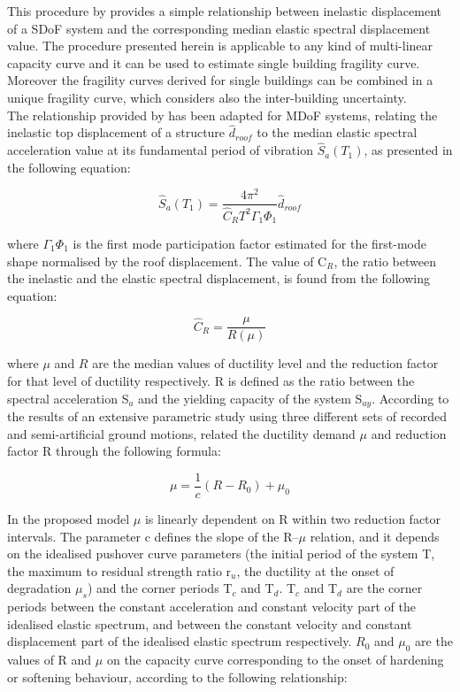 This procedure by \citep{DolsekFajfar2004} provides a simple relationship between inelastic displacement of a SDoF system and the corresponding median elastic spectral displacement value. The procedure presented herein is applicable to any kind of multi-linear capacity curve and it can be used to estimate single building fragility curve. Moreover the fragility curves derived for single buildings can be combined in a unique fragility curve, which considers also the inter-building uncertainty.\\

The relationship provided by \citep{DolsekFajfar2004} has been adapted for MDoF systems, relating the inelastic top displacement of a structure $\hat{d}_{roof}$ to the median elastic spectral acceleration value at its fundamental period of vibration $\hat{S}_{a}(T_1)$, as presented in the following equation:
 
\begin{equation}
\hat{S}_a(T_1) = \frac{4 \pi^2}{\hat{C}_R T^2 \Gamma_1 \Phi_1} \hat{d}_{roof}
\label{eq:basic_DF}
\end{equation}

where $\Gamma_1 \Phi_1$ is the first mode participation factor estimated for the first-mode shape normalised by the roof displacement. The value of C$_R$, the ratio between the inelastic and the elastic spectral displacement, is found from the following equation:

\begin{equation}
\hat{C}_{R} = \frac{\mu}{R(\mu)}
\label{eq:Cr_DF}
\end{equation}

where $\mu$ and $R$ are the median values of ductility level and the reduction factor for that level of ductility respectively. R is defined as the ratio between the spectral acceleration S$_a$ and the yielding capacity of the system S$_{ay}$.  According to the results of an extensive parametric study using three different sets of recorded and semi-artificial ground motions, \citep{DolsekFajfar2004} related the ductility demand $\mu$ and reduction factor R through the following formula:

\begin{equation}
\label{eq:mu_DF}
\mu = \frac{1}{c} (R-R_{0})+\mu_{0}
\end{equation}

In the proposed model $\mu$ is linearly dependent on R within two reduction factor intervals. The parameter c defines the slope of the R–$\mu$ relation, and it depends on the idealised pushover curve parameters (the initial period of the system T, the maximum to residual strength ratio r$_{u}$, the ductility at the onset of degradation $\mu_s$) and the corner periods T$_{c}$ and T$_{d}$. T$_{c}$ and T$_{d}$ are the corner periods between the constant acceleration and constant velocity part of the idealised elastic spectrum, and between the constant velocity and constant displacement part of the idealised elastic spectrum respectively. $R_{0}$ and $\mu_{0}$ are the values of R and $\mu$ on the capacity curve corresponding to the onset of hardening or softening behaviour, according to the following relationship:

